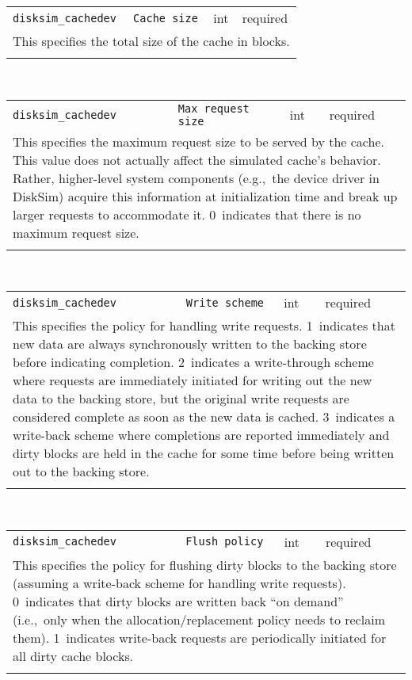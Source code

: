 \noindent 
\begin{tabular}{|p{\lpmodwidth}|p{\lpnamewidth}|p{0.5in}|p{0.5in}|}
\cline{1-4}
\texttt{disksim\_cachedev} & \texttt{Cache size} & int & required \\ 
\cline{1-4}
\multicolumn{4}{|p{6in}|}{
This specifies the total size of the cache in blocks.
}\\ 
\cline{1-4}
\multicolumn{4}{p{5in}}{}\\
\end{tabular}\\ 
\noindent 
\begin{tabular}{|p{\lpmodwidth}|p{\lpnamewidth}|p{0.5in}|p{0.5in}|}
\cline{1-4}
\texttt{disksim\_cachedev} & \texttt{Max request size} & int & required \\ 
\cline{1-4}
\multicolumn{4}{|p{6in}|}{
This specifies the maximum request size to be served by the cache. This
value does not actually affect the simulated cache's behavior.
Rather, higher-level system components (e.g.,~the device driver in
DiskSim) acquire this information at initialization time and break up
larger requests to accommodate it. 0~indicates that there is no
maximum request size.
}\\ 
\cline{1-4}
\multicolumn{4}{p{5in}}{}\\
\end{tabular}\\ 
\noindent 
\begin{tabular}{|p{\lpmodwidth}|p{\lpnamewidth}|p{0.5in}|p{0.5in}|}
\cline{1-4}
\texttt{disksim\_cachedev} & \texttt{Write scheme} & int & required \\ 
\cline{1-4}
\multicolumn{4}{|p{6in}|}{
This specifies the policy for handling write requests.
1~indicates that new data are always synchronously written to the
backing store before indicating completion.
2~indicates a write-through scheme where requests are immediately
initiated for writing out the new data to the backing store, but the
original write requests are considered complete as soon as the new
data is cached.
3~indicates a write-back scheme where completions are reported
immediately and dirty blocks are held in the cache for some time
before being written out to the backing store.
}\\ 
\cline{1-4}
\multicolumn{4}{p{5in}}{}\\
\end{tabular}\\ 
\noindent 
\begin{tabular}{|p{\lpmodwidth}|p{\lpnamewidth}|p{0.5in}|p{0.5in}|}
\cline{1-4}
\texttt{disksim\_cachedev} & \texttt{Flush policy} & int & required \\ 
\cline{1-4}
\multicolumn{4}{|p{6in}|}{
This specifies the policy for flushing dirty blocks to the backing store
(assuming a write-back scheme for handling write requests).
0~indicates that dirty blocks are written back ``on demand''
(i.e.,~only when the allocation/replacement policy needs to reclaim
them).
1~indicates write-back requests are periodically initiated for all
dirty cache blocks.
}\\ 
\cline{1-4}
\multicolumn{4}{p{5in}}{}\\
\end{tabular}\\ 
